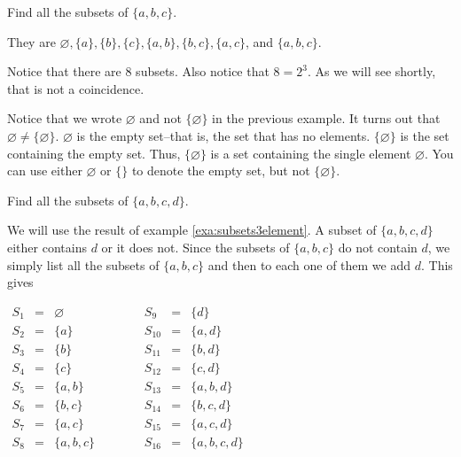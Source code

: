 \begin{exa}\label{exa:subsets3element}
Find all the subsets of $\{a, b, c\}$.
\begin{sol}
They are  $\varnothing, \{a\}, \{b\}, \{c\}, \{a, b\},
\{b, c\}, \{a, c\}$, and  $\{a, b, c\}$.
\end{sol}
Notice that there are 8 subsets.  Also notice that $8=2^3$.  As we will see shortly, that is not a coincidence.
\end{exa}

Notice that we wrote $\varnothing$ and not $\{\varnothing\}$ in the previous example.  
It turns out that
$\varnothing\neq \{\varnothing\}$.  $\varnothing$ is the empty set--that is, the set that has no elements.
$\{\varnothing\}$ is the set containing the empty set.  
Thus, $\{\varnothing\}$ is a set containing the single element $\varnothing$. 
You can use either $\varnothing$ or $\{\}$ to denote the empty set, but not $\{\varnothing\}$. 

\newpage %

\begin{exer}\label{exa:subsets4element}
Find all the subsets of $\{a, b, c, d\}$.
\vspace*{2.25in}
\begin{answer}
 We will use the result of example
\ref{exa:subsets3element}.
A subset of $\{a, b, c, d\}$
either contains $d$ or it does not.
Since the subsets of $\{a, b, c\}$ do not contain $d$, we simply list all the subsets of $\{a, b, c\}$ and then to each one of them  we add $d$. This gives

$\begin{array}{lllllll} S_1 & = & \varnothing & \hspace{1cm} &  S_9 & = & \{d\} \\
S_2 & = & \{a\} & \hspace{1cm} &  S_{10} & = & \{a, d\} \\
S_3 & = & \{b\}& \hspace{1cm} &  S_{11} & = & \{b, d\} \\
S_4 & = & \{c\} & \hspace{1cm} &  S_{12} & = & \{c, d\} \\
S_5 & = & \{a, b\}& \hspace{1cm} &  S_{13} & = & \{a, b, d\} \\
S_6 & = & \{b, c\}& \hspace{1cm} &  S_{14} & = & \{b, c, d\}  \\
S_7 & = & \{a, c\} & \hspace{1cm} &  S_{15} & = & \{a, c, d\} \\
S_8 & = & \{a, b, c\} & \hspace{1cm} &  S_{16} & = & \{a, b, c, d\}  \\
\end{array}   $
\end{answer}
\end{exer}


